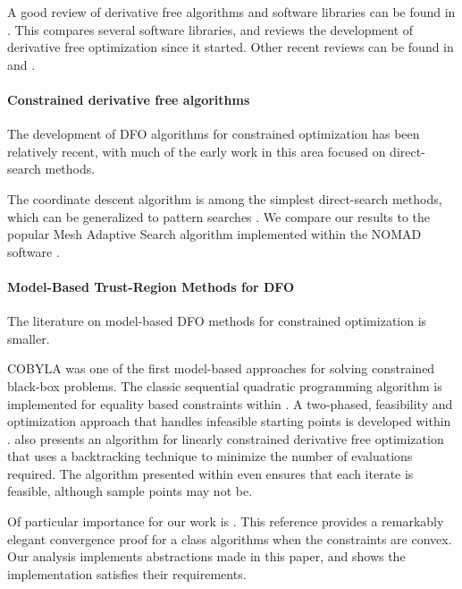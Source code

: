 A good review of derivative free algorithms and software libraries can be found in \cite{miguel_review}.
This compares several software libraries, and reviews the development of derivative free optimization since it started.
Other recent reviews can be found in \cite{custodio_review2} and \cite{larson_menickelly_wild_2019}.


\paragraph*{Constrained derivative free algorithms}
The development of DFO algorithms for constrained optimization has been relatively recent,
with much of the early work in this area focused on direct-search methods.

The coordinate descent algorithm is among the simplest direct-search methods, 
which can be generalized to pattern searches \cite{Audet2002AnalysisOG}. 
We compare our results to the popular Mesh Adaptive Search algorithm implemented within the NOMAD software
\cite{Le2011a}.


\paragraph*{Model-Based Trust-Region Methods for DFO}
The literature on model-based DFO methods for constrained optimization is smaller. 

COBYLA \cite{pub.1046127469} was one of the first model-based approaches for solving constrained black-box problems.
The classic sequential quadratic programming algorithm is implemented for equality based constraints within \cite{Troltzsch2016}.
A two-phased, feasibility and optimization approach that handles infeasible starting points is developed within \cite{BAJAJ2018306}.
\cite{Gao2018} also presents an algorithm for linearly constrained derivative free optimization that uses a backtracking technique to minimize the number of evaluations required.
The algorithm presented within \cite{doi:10.1080/10556788.2015.1026968} even ensures that each iterate is feasible, 
although sample points may not be.

Of particular importance for our work is \cite{Conejo:2013:GCT:2620806.2621814}.
This reference provides a remarkably elegant convergence proof for a class algorithms when the constraints are convex.
Our analysis implements abstractions made in this paper, and shows the implementation satisfies their requirements.


